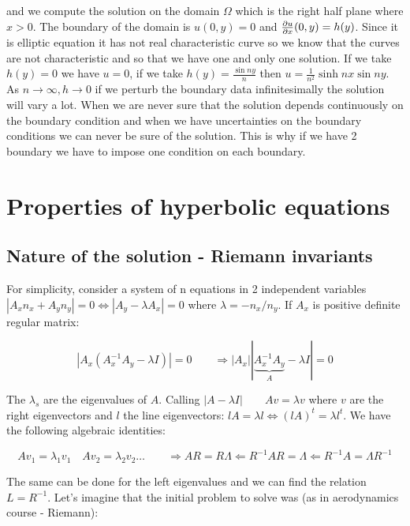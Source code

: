 and we compute the solution on the domain $\Omega$ which is the right half plane where $x>0$. The boundary of the domain is $u(0,y) = 0$ and $\frac{\partial u}{\partial x}(0,y) = h(y)$. Since it is elliptic equation it has not real characteristic curve so we know that the curves are not characteristic and so that we have one and only one solution. If we take $h(y) = 0$ we have $u=0$, if we take $h(y) = \frac{\sin ny}{n}$ then $u = \frac{1}{n^2}\sinh nx \sin ny$. As $n\rightarrow \infty, h \rightarrow 0$ if we perturb the boundary data infinitesimally the solution will vary a lot. When we are never sure that the solution depends continuously on the boundary condition and when we have uncertainties on the boundary conditions we can never be sure of the solution. This is why if we have 2 boundary we have to impose one condition on each boundary. 

\section{Properties of hyperbolic equations}
\subsection{Nature of the solution - Riemann invariants}
For simplicity, consider a system of n equations in 2 independent variables $|A_x n_x + A_y n_y| = 0 \Leftrightarrow |A_y - \lambda A_x| = 0$ where $\lambda = -n_x/n_y$. If $A_x$ is positive definite regular matrix: 

\begin{equation}
|A_x (A_x^{-1}A_y - \lambda I)| = 0 \qquad \Rightarrow |A_x||\underbrace{A_x^{-1}A_y}_{A}-\lambda I| = 0
\end{equation}

The $\lambda _s$ are the eigenvalues of $A$. Calling $|A-\lambda I| \qquad Av = \lambda v$ where $v$ are the right eigenvectors and $l$ the line eigenvectors: $lA = \lambda l \Leftrightarrow (lA)^t = \lambda l^t$. We have the following algebraic identities: 

\begin{equation}
Av_1 = \lambda _1v_1 \quad Av_2 = \lambda _2v_2 \dots \qquad \Rightarrow A R = R \Lambda \Leftarrow R^{-1}AR = \Lambda \Leftarrow R^{-1} A = \Lambda R^{-1}
\end{equation}

The same can be done for the left eigenvalues and we can find the relation $L = R^{-1}$. Let's imagine that the initial problem to solve was (as in aerodynamics course - Riemann): 

